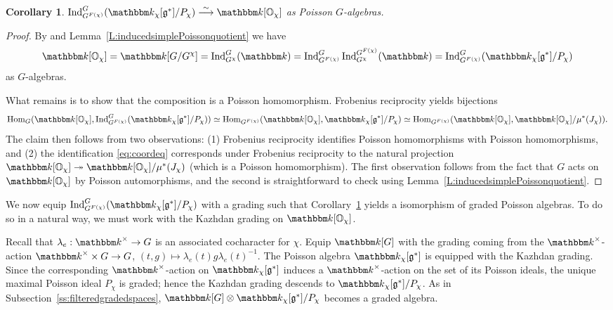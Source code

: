 \documentclass[twoside,12pt,reqno]{amsart}
\newtheorem{Corollary}[Theorem]{Corollary}
\theoremstyle{remark}
\numberwithin{equation}{section}
\def\isoto{\overset{\sim}{\longrightarrow}}
\def\k{{\mathbbm k}}
\def\Ind{\operatorname{Ind}}
\def\Hom{\operatorname{Hom}}
\def\O{{\mathbb O}}
\def\g{{\mathfrak g}}
\begin{document}
\begin{Corollary}
\label{C:coordasinduced}
    $\Ind_{G^{F(\chi)}}^G (\k_\chi[\g^*] / P_\chi) \isoto \k[\O_\chi]$ as Poisson $G$-algebras.
\end{Corollary}
\begin{proof}
    By \cite[I.3.5(2) \& I.5.6(2)]{JanRAGS} and Lemma~\ref{L:inducedsimplePoissonquotient} we have
    \begin{equation}\label{eq:coordeq}
    \k[\O_\chi] = \k[G / G^\chi] = \Ind_{G^\chi}^G(\k) = \Ind_{G^{F(\chi)}}^G \Ind_{G^\chi}^{G^{F(\chi)}} (\k) = \Ind_{G^{F(\chi)}}^G (\k_\chi[\g^*] / P_\chi)
    \end{equation}
    as $G$-algebras. 
    
    What remains is to show that the composition is a Poisson homomorphism. Frobenius reciprocity yields bijections $$\Hom_G(\k[\O_\chi],\Ind_{G^{F(\chi)}}^G(\k_\chi[\g^*]/P_\chi))\simeq\Hom_{G^{F(\chi)}}(\k[\O_\chi],\k_\chi[\g^*]/P_\chi)\simeq\Hom_{G^{F(\chi)}}(\k[\O_\chi],\k[\O_\chi]/\mu^*(J_\chi)).$$ The claim then follows from two observations: (1) Frobenius reciprocity identifies Poisson homomorphisms with Poisson homomorphisms, and (2) the identification \eqref{eq:coordeq} corresponds under Frobenius reciprocity to the natural projection $\k[\O_\chi]\twoheadrightarrow \k[\O_\chi]/\mu^*(J_\chi)$ (which is a Poisson homomorphism). The first observation follows from the fact that $G$ acts on $\k[\O_\chi]$ by Poisson automorphisms, and the second is straightforward to check using Lemma~\ref{L:inducedsimplePoissonquotient}.
\end{proof}

We now equip $\Ind_{G^{F(\chi)}}^G (\k_\chi[\g^*] / P_\chi)$ with a grading such that Corollary~\ref{C:coordasinduced} yields a isomorphism of graded Poisson algebras. To do so in a natural way, we must work with the Kazhdan grading on $\k[\O_\chi]$. 

Recall that $\lambda_e:\k^\times\to G$ is an associated cocharacter for $\chi$. Equip $\k[G]$ with the grading coming from the $\k^\times$-action $\k^\times\times G\to G$, $(t,g)\mapsto \lambda_e(t)g\lambda_e(t)^{-1}$. The Poisson algebra $\k_\chi[\g^*]$ is equipped with the Kazhdan grading. Since the corresponding $\k^\times$-action on $\k_\chi[\g^*]$ induces a $\k^\times$-action on the set of its Poisson ideals, the unique maximal Poisson ideal $P_\chi$ is graded; hence the Kazhdan grading descends to $\k_\chi[\g^*]/P_\chi$. As in Subsection~\ref{ss:filteredgradedspaces}, $\k[G]\otimes \k_\chi[\g^*]/P_\chi$ becomes a graded algebra.
\end{document}
